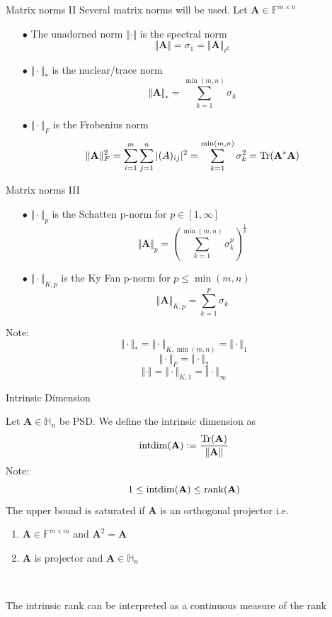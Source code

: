 \documentclass{beamer}
\newcommand{\bvec}[1]{\mathbf{#1}}
\newcommand{\vA}{\bvec{A}}
\begin{document}
\begin{frame}{Matrix norms II}
Several matrix norms will be used. Let $\vA \in \mathbb{F}^{m \times n}$
\begin{itemize}
    \item[$\bullet$] The unadorned norm $\Vert \cdot \Vert$ is the spectral norm
    $$
    \Vert \vA \Vert 
    =
    \sigma_1
    =
    \Vert \vA \Vert_{\ell^2} 
    $$
    \item[$\bullet$] $\Vert \cdot \Vert_*$ is the nuclear/trace norm
    $$
    \Vert \vA \Vert_*
    =
    \sum_{k=1}^{\min(m,n)} \sigma_k
    $$
    \item[$\bullet$] $\Vert \cdot \Vert_F$ is the Frobenius norm
    $$
    \Vert \vA \Vert_F^2
    =
    \sum_{i=1}^m\sum_{j=1}^n |(A)_{ij}|^2
    =
    \sum_{k=1}^{\min(m,n)} \sigma_k^2
    =
    {\rm Tr}(\vA^* \vA)
    $$
\end{itemize}
\end{frame}

\begin{frame}{Matrix norms III}

\begin{itemize}
    \item[$\bullet$] $\Vert \cdot \Vert_p$ is the Schatten p-norm for $p\in [1,\infty]$
    $$
    \Vert \vA \Vert_p
    =
    \left( 
    \sum_{k=1}^{\min(m,n)} \sigma_k^p
    \right)^{\frac{1}{p}}
    $$
    \item[$\bullet$] $\Vert \cdot \Vert_{K,p}$ is the Ky Fan p-norm for $p\leq \min(m,n)$
    $$
    \Vert \vA \Vert_{K,p}
    =
    \sum_{k=1}^{p} \sigma_k
    $$
\end{itemize}
Note:
$$
\Vert \cdot \Vert_*
=
\Vert \cdot \Vert_{K,\min(m,n)} 
=
\Vert \cdot \Vert_{1} 
$$
$$
\Vert \cdot \Vert_F
=
\Vert \cdot \Vert_2
$$
$$
\Vert \cdot \Vert 
= \Vert \cdot \Vert_{K,1}
= \Vert \cdot \Vert_{\infty}
$$
\end{frame}


\begin{frame}{Intrinsic Dimension}

Let $\vA\in\mathbb{H}_n$ be PSD. We define the intrinsic dimension as
$$
{\rm intdim}(\vA)
:=
\frac{{\rm Tr}(\vA)}{\Vert \vA \Vert}
$$
Note:
$$
1\leq {\rm intdim}(\vA) \leq {\rm rank} (\vA)
$$
The upper bound is saturated if $\vA$ is an orthogonal projector i.e.
\begin{enumerate}
    \item $\vA \in \mathbb{F}^{m\times m}$ and $\vA ^2 = \vA $
    \item $\vA$ is projector and $\vA \in \mathbb{H}_n$
\end{enumerate}
~\\
\begin{center}
The intrinsic rank can be interpreted as a continuous measure of the rank
\end{center}
    
\end{frame}
\end{document}
